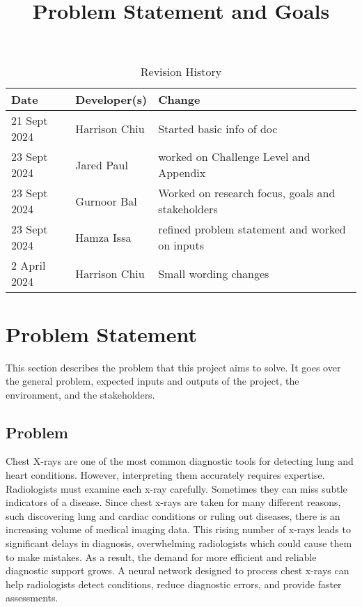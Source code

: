 \documentclass{article}
\title{Problem Statement and Goals\\\progname}
\author{\authname}
\date{}
\begin{document}
\maketitle

\begin{table}[hp]
\caption{Revision History} \label{TblRevisionHistory}
\begin{tabularx}{\textwidth}{llX}
\toprule
\textbf{Date} & \textbf{Developer(s)} & \textbf{Change}\\
\midrule
21 Sept 2024 & Harrison Chiu & Started basic info of doc \\
23 Sept 2024 & Jared Paul & worked on Challenge Level and Appendix\\
23 Sept 2024 & Gurnoor Bal & Worked on research focus, goals and stakeholders\\
23 Sept 2024 & Hamza Issa & refined problem statement and worked on inputs\\
2 April 2024 & Harrison Chiu & Small wording changes\\
\bottomrule
\end{tabularx}
\end{table}

\section{Problem Statement}

This section describes the problem that this project aims to solve. It goes over the general
problem, expected inputs and outputs of the project, the environment, and the stakeholders.


\subsection{Problem}

Chest X-rays are one of the most common diagnostic tools for detecting lung and heart conditions.
However, interpreting them accurately requires expertise. Radiologists must examine each x-ray 
carefully. Sometimes they can miss subtle indicators of a disease. Since chest x-rays are taken
for many different reasons, such discovering lung and cardiac conditions or ruling out diseases, 
there is an increasing volume of medical imaging data. This rising number of x-rays leads to
significant delays in diagnosis, overwhelming radiologists which could cause them to make 
mistakes. As a result, the demand for more efficient and reliable diagnostic support grows. A 
neural network designed to process chest x-rays can help radiologists detect conditions, reduce 
diagnostic errors, and provide faster assessments.
\end{document}
